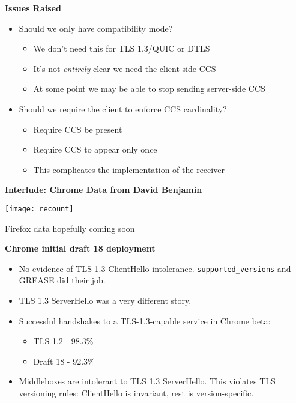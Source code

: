 \documentclass[helvetica]{seminar}
\newcommand{\heading}[1]{%
  \begin{center} 
    \large\bf 
    #1 
  \end{center} 
  \vspace{.4 in}}
\begin{document}
\begin{slide}
  \heading{Issues Raised}

  \begin{itemize}
  \item Should we \textsf{only} have compatibility mode?
    \begin{itemize}
    \item We don't need this for TLS 1.3/QUIC or DTLS
    \item It's not \emph{entirely} clear we need the client-side CCS
    \item At some point we may be able to stop sending server-side CCS
    \end{itemize}

  \item Should we require the client to enforce CCS cardinality?
    \begin{itemize}
    \item Require CCS be present
    \item Require CCS to appear only once
    \item This complicates the implementation of the receiver
    \end{itemize}
  \end{itemize}
\end{slide}


\begin{slide}
\heading{Interlude: Chrome Data from David Benjamin}

\texttt{[image: recount]}

\vspace{1ex}

Firefox data hopefully coming soon

\end{slide}


\begin{slide}
\heading{Chrome initial draft 18 deployment}

\begin{itemize}
\item No evidence of TLS 1.3 ClientHello intolerance. \verb^supported_versions^ and GREASE did their job.
\item TLS 1.3 ServerHello was a very different story.

\item Successful handshakes to a TLS-1.3-capable service in Chrome beta:
  \begin{itemize}
  \item TLS 1.2 - 98.3\%
  \item Draft 18 - 92.3\%
  \end{itemize}

\item Middleboxes are intolerant to TLS 1.3 ServerHello. This violates TLS versioning rules: ClientHello is invariant, rest is version-specific.
  
\end{itemize}
\end{slide}
\end{document}
